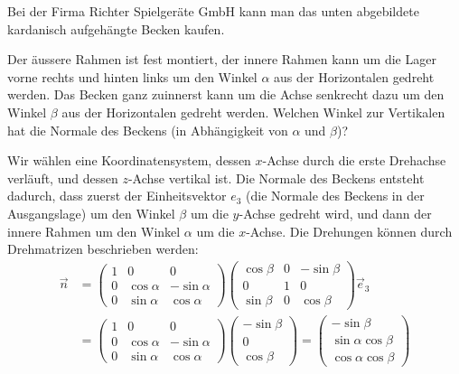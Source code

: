 Bei der Firma Richter Spielgeräte GmbH kann man das unten abgebildete
kardanisch aufgehängte Becken kaufen. 
\begin{center}
\end{center}
Der äussere Rahmen ist fest montiert, der innere Rahmen kann um
die Lager vorne rechts und hinten links um den Winkel $\alpha$
aus der Horizontalen
gedreht werden. Das Becken ganz zuinnerst kann um die Achse
senkrecht dazu um den Winkel $\beta$ aus der Horizontalen gedreht werden.
Welchen
Winkel zur Vertikalen hat die Normale des Beckens (in Abhängigkeit
von $\alpha$ und $\beta$)?


\begin{loesung}
Wir wählen eine Koordinatensystem, dessen $x$-Achse durch die
erste Drehachse verläuft, und dessen $z$-Achse vertikal ist.
Die Normale des Beckens entsteht dadurch, dass zuerst der
Einheitsvektor $e_3$ (die Normale des Beckens in der Ausgangslage)
um den Winkel $\beta$ um die $y$-Achse gedreht wird,
und dann der innere Rahmen um den Winkel $\alpha$ um die
$x$-Achse. Die Drehungen können durch Drehmatrizen beschrieben werden:
\begin{align*}
\vec n
&=
\begin{pmatrix}
1&0&0\\
0&\cos\alpha&-\sin\alpha\\
0&\sin\alpha& \cos\alpha
\end{pmatrix}
\begin{pmatrix}
\cos\beta&0&-\sin\beta\\
0&1&0\\
\sin\beta&0&\cos\beta
\end{pmatrix}\vec e_3
\\
&=
\begin{pmatrix}
1&0&0\\
0&\cos\alpha&-\sin\alpha\\
0&\sin\alpha& \cos\alpha
\end{pmatrix}
\begin{pmatrix}
-\sin\beta\\
0\\
\cos\beta
\end{pmatrix}
=
\begin{pmatrix}
-\sin\beta\\
\sin\alpha\cos\beta\\
\cos\alpha\cos\beta
\end{pmatrix}
\end{align*}

\end{loesung}
